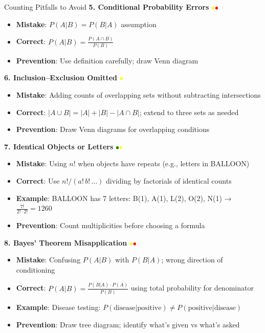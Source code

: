 \documentclass{article}
\begin{document}
\begin{trapbox}{Counting Pitfalls to Avoid}
\textbf{5. Conditional Probability Errors} \textcolor{yellow}{$\bullet$}\textcolor{red}{$\bullet$}
\begin{itemize}[nosep]
\item \textbf{Mistake}: $P(A|B) = P(B|A)$ assumption
\item \textbf{Correct}: $P(A|B) = \frac{P(A \cap B)}{P(B)}$
\item \textbf{Prevention}: Use definition carefully; draw Venn diagram
\end{itemize}
\textbf{6. Inclusion--Exclusion Omitted} \textcolor{yellow}{$\bullet$}
\begin{itemize}[nosep]
\item \textbf{Mistake}: Adding counts of overlapping sets without subtracting intersections
\item \textbf{Correct}: $|A\cup B| = |A| + |B| - |A\cap B|$; extend to three sets as needed
\item \textbf{Prevention}: Draw Venn diagrams for overlapping conditions
\end{itemize}
\textbf{7. Identical Objects or Letters} \textcolor{green}{$\bullet$}\textcolor{yellow}{$\bullet$}
\begin{itemize}[nosep]
\item \textbf{Mistake}: Using $n!$ when objects have repeats (e.g., letters in BALLOON)
\item \textbf{Correct}: Use $n!/(a!\,b!\,\dots)$ dividing by factorials of identical counts
\item \textbf{Example}: BALLOON has 7 letters: B(1), A(1), L(2), O(2), N(1) → $\frac{7!}{2! \cdot 2!} = 1260$
\item \textbf{Prevention}: Count multiplicities before choosing a formula
\end{itemize}

\textbf{8. Bayes' Theorem Misapplication} \textcolor{yellow}{$\bullet$}\textcolor{red}{$\bullet$}
\begin{itemize}[nosep]
\item \textbf{Mistake}: Confusing $P(A|B)$ with $P(B|A)$; wrong direction of conditioning
\item \textbf{Correct}: $P(A|B) = \frac{P(B|A) \cdot P(A)}{P(B)}$ using total probability for denominator
\item \textbf{Example}: Disease testing: $P(\text{disease}|\text{positive}) \neq P(\text{positive}|\text{disease})$
\item \textbf{Prevention}: Draw tree diagram; identify what's given vs what's asked
\end{itemize}


\end{trapbox}
\end{document}
